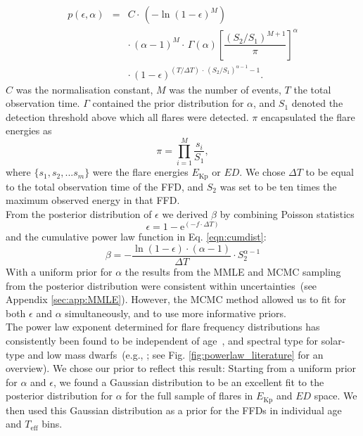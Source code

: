 \documentclass{aa}
\begin{document}
\begin{eqnarray}
\label{joint_posterior}
p(\epsilon, \alpha) &=& C \cdot\, (-\ln(1 - \epsilon)^{M})\nonumber\\
                    && \cdot\, (\alpha-1)^M \cdot\, \Gamma(\alpha) \left[\dfrac{(S_2 / S_1)^{M+1}}{\pi} \right]^{\alpha}\nonumber\\
                    && \cdot\, (1-\epsilon)^{(T / \Delta T) \,\cdot\, (S_2 /S_1)^{\alpha-1} -1 }.
\end{eqnarray}
$C$ was the normalisation constant, $M$ was the number of events, $T$ the total observation time. $\Gamma$ contained the prior distribution for $\alpha$, and $S_1$ denoted the detection threshold above which all flares were detected. $\pi$ encapsulated the flare energies as
\begin{equation}
    \pi = \displaystyle \prod_{i=1}^M \dfrac{s_i}{S_1},
\end{equation}
where $\{s_1,s_2,...s_m\}$ were the flare energies $E_\mathrm{Kp}$ or $ED$. We chose $\Delta T$ to be equal to the total observation time of the FFD, and $S_2$ was set to be ten times the maximum observed energy in that FFD.
\\
From the posterior distribution of $\epsilon$ we derived $\beta$ by combining Poisson statistics 
\begin{equation}
\epsilon = 1 - \mathrm{e}^{(-f\cdot\Delta T)}
\label{poissonstats}
\end{equation}
and the cumulative power law function in Eq. \ref{eqn:cumdist}:
\begin{equation}
\beta = - \dfrac{\ln(1 - \epsilon)\cdot (\alpha -1)}{\Delta T} \cdot S_2^{\alpha -1}
\label{eqn:epstobeta}
\end{equation}
With a uniform prior for $\alpha$ the results from the MMLE and MCMC sampling from the posterior distribution were consistent within uncertainties~(see Appendix \ref{sec:app:MMLE}). However, the MCMC method allowed us to fit for both $\epsilon$ and $\alpha$ simultaneously, and to use more informative priors. 
\\
The power law exponent determined for flare frequency distributions has consistently been found to be independent of age~\citep{davenport2019}, and spectral type for solar-type and low mass dwarfs~(e.g., \citealt{chang2015, howard2019, lin2019}; see Fig. \ref{fig:powerlaw_literature} for an overview). We chose our prior to reflect this result: Starting from a uniform prior for $\alpha$ and $\epsilon$, we found a Gaussian distribution to be an excellent fit to the posterior distribution for $\alpha$ for the full sample of flares in $E_\mathrm{Kp}$ and $ED$ space. We then used this Gaussian distribution as a prior for the FFDs in individual age and $T_\mathrm{eff}$ bins. 
\end{document}
